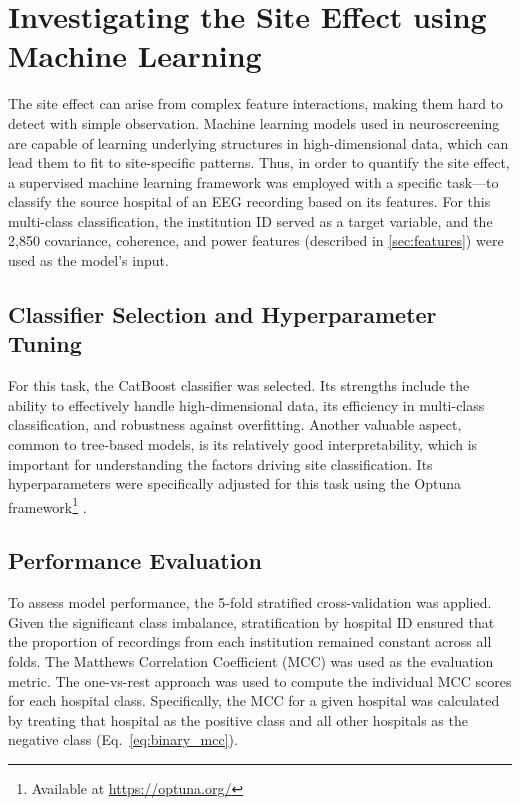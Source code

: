 \documentclass{bachelor2025eng}
\begin{document}
    \section{Investigating the Site Effect using Machine Learning}
    \label{sec:machine_learning}
            The site effect can arise from complex feature interactions, making them hard to detect with simple observation. Machine learning models used in neuroscreening are capable of learning underlying structures in high-dimensional data, which can lead them to fit to site-specific patterns. Thus, in order to quantify the site effect, a supervised machine learning framework was employed with a specific task—to classify the source hospital of an EEG recording based on its features. For this multi-class classification, the institution ID served as a target variable, and the 2,850 covariance, coherence, and power features (described in \autoref{sec:features}) were used as the model's input. 
        \subsection{Classifier Selection and Hyperparameter Tuning}
            For this task, the CatBoost classifier \cite{Prokhorenkova2017} was selected. Its strengths include the ability to effectively handle high-dimensional data, its efficiency in multi-class classification, and robustness against overfitting. Another valuable aspect, common to tree-based models, is its relatively good interpretability, which is important for understanding the factors driving site classification.  Its hyperparameters were specifically adjusted for this task using the Optuna framework\footnote{Available at \url{https://optuna.org/}} \cite{Akiba2019}.

        \subsection{Performance Evaluation}
            To assess model performance, the 5-fold stratified cross-validation was applied. Given the significant class imbalance, stratification by hospital ID ensured that the proportion of recordings from each institution remained constant across all folds. The Matthews Correlation Coefficient (MCC) was used as the evaluation metric. The one-vs-rest approach was used to compute the individual MCC scores for each hospital class. Specifically, the MCC for a given hospital was calculated by treating that hospital as the positive class and all other hospitals as the negative class (Eq.~\ref{eq:binary_mcc}).
    
\end{document}
